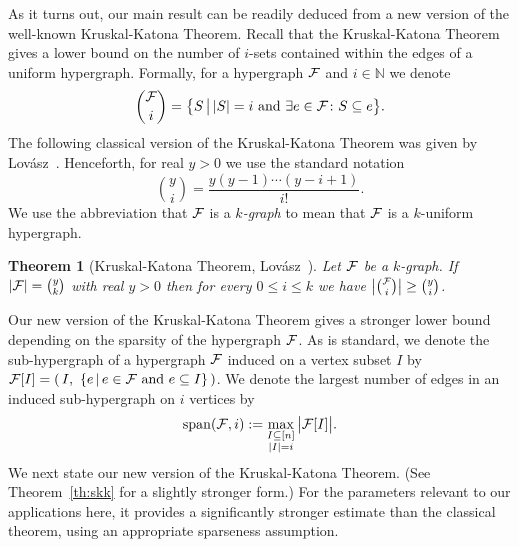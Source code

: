 \documentclass[11pt]{article}
\newtheorem{theo}{Theorem}[section]
\newcommand{\FF}{{\cal F}}
\renewcommand{\wp}{\mathrm{span}}
\newcommand{\sub}{\subseteq}
\newcommand{\N}{\mathbb{N}}
\DeclareMathOperator{\trace}{Tr}
\begin{document}
As it turns out, our main result can be readily deduced from a new version of the well-known Kruskal-Katona Theorem.
Recall that the Kruskal-Katona Theorem gives a lower bound on the number of $i$-sets contained within the edges of a uniform hypergraph. Formally, for a hypergraph $\FF$ and $i \in \N$ we denote 
$$\binom{\FF}{i} = \big\{S \,\big\vert\, |S|=i \text{ and } \exists e \in \FF \colon S \sub e \big\}.$$
The following classical version of the Kruskal-Katona Theorem 
was given by Lov\'asz~\cite{Lovasz}.
Henceforth, for real $y > 0$ we use the standard notation 
$$\binom{y}{i}=\frac{y(y-1)\cdots(y-i+1)}{i!} .$$ 
We use the abbreviation that $\FF$ is a \emph{$k$-graph} 
to mean that $\FF$ is a $k$-uniform hypergraph.

\begin{theo}[Kruskal-Katona Theorem, Lov\'asz~\cite{Lovasz}]%
	\label{th:kk}
	Let $\FF$ be a $k$-graph. 
	If $|\FF| = \binom{y}{k}$ with real $y > 0$
	then for every $0 \le i \le k$ we have $\big|\binom{\FF}{i}
\big| \ge \binom{y}{i}$.
\end{theo}

Our new version of the Kruskal-Katona Theorem gives a stronger lower bound depending on the sparsity %
of the hypergraph $\FF$.
As is standard, we denote the sub-hypergraph of a hypergraph $\FF$ induced on a vertex subset $I$ by
$\FF[I] =(\,I, \,\,\{e\,\vert\, e \in \FF \text{ and } e\sub I\}\,)$.
We denote the largest number of edges in an induced sub-hypergraph on $i$ vertices by
$$\wp(\FF,i) := \max_{\substack{I \sub [n]\\|I|=i}} \big|\FF[I]\big|.$$
%
We next state our new version of the Kruskal-Katona Theorem. 
(See Theorem~\ref{th:skk} for a slightly stronger form.)
For the parameters relevant to our applications here, it provides
a significantly stronger estimate than the classical theorem,
using an appropriate sparseness assumption.
\end{document}
